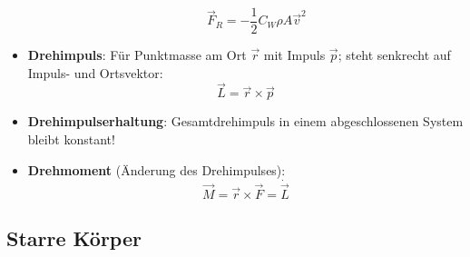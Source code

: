\begin{itemize}
\begin{itemize}
\begin{equation}
			\vec{F}_R = -\frac{1}{2}C_W\rho A \vec{v}^2
		\end{equation}
	\end{itemize}
	\item \textbf{Drehimpuls}: Für Punktmasse am Ort $\vec{r}$ mit Impuls $\vec{p}$; steht senkrecht auf Impuls- und Ortsvektor:
	\begin{equation}
		\vec{L} = \vec{r} \times \vec{p}
	\end{equation}
	\item \textbf{Drehimpulserhaltung}: Gesamtdrehimpuls in einem abgeschlossenen System bleibt konstant!
	\item \textbf{Drehmoment} (Änderung des Drehimpulses):
	\begin{equation}
		\vec{M} = \vec{r} \times \vec{F} = \dot{\vec{L}}
	\end{equation}
\end{itemize}

\subsection{Starre Körper}%
\label{mech:sub:starre_koerper}

